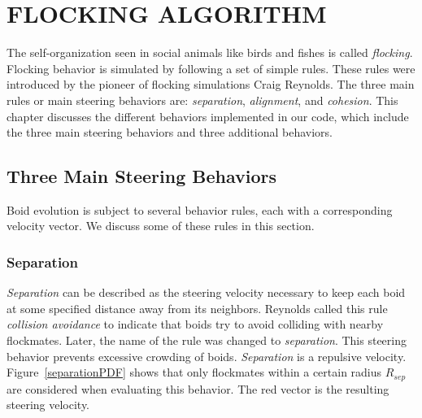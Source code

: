 \chapter{FLOCKING ALGORITHM}\label{chap3}

The self-organization seen in social animals like birds and fishes is called \textit{flocking}. Flocking behavior is simulated by following a set of simple rules. These rules were introduced by the pioneer of flocking simulations Craig Reynolds\cite{craig1}. The three main rules or main steering behaviors are: \textit{separation}, \textit{alignment}, and \textit{cohesion}. This chapter discusses the different behaviors implemented in our code, which include the three main steering behaviors and three additional behaviors.

\section{Three Main Steering Behaviors}
Boid evolution is subject to several behavior rules, each with a corresponding
velocity vector. We discuss some of these rules in this section. 


	

\subsection{Separation}\label{separationsection}
\textit{Separation} can be described as the steering velocity necessary to keep each boid at some specified distance away from its neighbors. Reynolds called this rule \textit{collision avoidance} to indicate that boids try to avoid colliding with nearby flockmates. Later, the name of the rule was changed to \textit{separation}. This steering behavior prevents excessive crowding of boids. \textit{Separation} is a repulsive velocity. Figure~\ref{separationPDF} shows that only flockmates within a certain radius $R_{sep}$ are considered when evaluating this behavior. The red vector is the resulting steering velocity.

